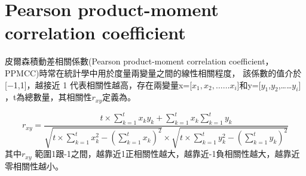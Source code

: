 \chapter{Pearson product-moment correlation coefficient}
\label{chapter:intro}
皮爾森積動差相關係數(Pearson product-moment correlation coefficient，PPMCC)時常在統計學中用於度量兩變量之間的線性相關程度， 該係數的值介於[−1,1]，越接近 1 代表相關性越高，存在兩變量x=[$x_1,x_2,……x_i$]和y=[$y_1$,$y_2$,……$y_i$] ，t為總數量，其相關性$r_{xy}$定義為。

\begin{equation}
\label{eqn:Pearson }
    r_{xy}=\frac{t\times\sum_{k=1}^{t}x_ky_k+\sum_{k=1}^{t}x_k\sum_{k=1}^{t}y_k}{\sqrt{t\times \sum_{k=1}^{t}x_k^2-(\sum_{k=1}^{t}x_k)^2}\times\sqrt{t\times\sum_{k=1}^{t}y_k^2-(\sum_{k=1}^{t}y_k)^2}}
\end{equation}
其中$r_{xy}$ 範圍1跟-1之間，越靠近1正相關性越大，越靠近-1負相關性越大，越靠近零相關性越小。
    